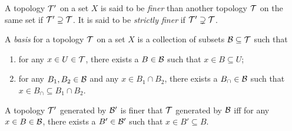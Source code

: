 \begin{definition}[Refinement] \label{def:refinement}
    A topology $\mathcal{T}'$ on a set $X$ is said to be \emph{finer} than
    another topology $\mathcal{T}$ on the same set if $\mathcal{T}' \supseteq \mathcal{T}$.
    It is said to be \emph{strictly finer} if $\mathcal{T}' \supsetneq \mathcal{T}$.
\end{definition}

\begin{definition*}[Basis] \label{def:basis}
    A \emph{basis} for a topology $\mathcal{T}$ on a set $X$ is a collection
    of subsets $\mathcal{B} \subseteq \mathcal{T}$ such that
    \begin{enumerate}[label=\small(B\arabic*)]
        \item for any $x \in U \in \mathcal{T}$, there exists a $B \in \mathcal{B}$
            such that $x \in B \subseteq U$;
        \item for any $B_1, B_2 \in \mathcal{B}$ and any $x \in B_1 \cap B_2$,
            there exists a $B_\cap \in \mathcal{B}$ such that
            $x \in B_\cap \subseteq B_1 \cap B_2$.
    \end{enumerate}
\end{definition*}

\begin{proposition} \label{thm:finer-basis}
    A topology $\mathcal{T}'$ generated by $\mathcal{B}'$ is finer that
    $\mathcal{T}$ generated by $\mathcal{B}$ iff
    for any $x \in B \in \mathcal{B}$, there exists a $B' \in \mathcal{B}'$ such that
    $x \in B' \subseteq B$.
\end{proposition}
